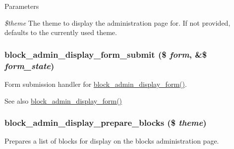 \begin{DoxyParams}{Parameters}
\item[{\em \$theme}]The theme to display the administration page for. If not provided, defaults to the currently used theme. \end{DoxyParams}
\hypertarget{block_8admin_8inc_a9a7a5d16e2db34422f490e08d4bda247}{
\subsubsection[{block\_\-admin\_\-display\_\-form\_\-submit}]{\setlength{\rightskip}{0pt plus 5cm}block\_\-admin\_\-display\_\-form\_\-submit (\$ {\em form}, \/  \&\$ {\em form\_\-state})}}
\label{block_8admin_8inc_a9a7a5d16e2db34422f490e08d4bda247}
Form submission handler for \hyperlink{group__forms_ga19dc9d98e83e7e7c9574298100752ba7}{block\_\-admin\_\-display\_\-form()}.

\begin{DoxySeeAlso}{See also}
\hyperlink{group__forms_ga19dc9d98e83e7e7c9574298100752ba7}{block\_\-admin\_\-display\_\-form()} 
\end{DoxySeeAlso}
\hypertarget{block_8admin_8inc_af1b2a0aeb8b76a4bc99d435bf5d08fd1}{
\subsubsection[{block\_\-admin\_\-display\_\-prepare\_\-blocks}]{\setlength{\rightskip}{0pt plus 5cm}block\_\-admin\_\-display\_\-prepare\_\-blocks (\$ {\em theme})}}
\label{block_8admin_8inc_af1b2a0aeb8b76a4bc99d435bf5d08fd1}
Prepares a list of blocks for display on the blocks administration page.


